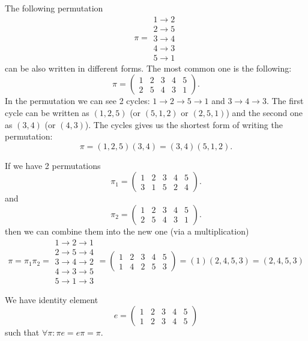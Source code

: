 \begin{appendices}
\begin{example}[Permutation]
  The following permutation
  \[ \pi = 
  \begin{array}{c}
    1 \to 2 \\
    2 \to 5 \\
    3 \to 4 \\
    4 \to 3 \\
    5 \to 1 
  \end{array}
  \]
  can be also written in different forms. The most common one is the following:
  \[
  \pi = \begin{pmatrix}
    1 & 2 & 3 & 4 & 5 \\
    2 & 5 & 4 & 3 & 1
  \end{pmatrix}.
  \]
  In the permutation we can see 2 cycles:
  $1 \to 2 \to 5 \to 1$ and $3 \to 4 \to 3$. The first cycle can be
  written as $(1,2,5)$ (or $(5,1,2)$ or $(2,5,1)$) and the second
  one as $(3,4)$ (or $(4,3)$). The cycles gives us the shortest form
  of writing the permutation:
  \[
  \pi = (1,2,5)(3,4) = (3,4)(5,1,2).
  \]
  
  If we have 2 permutations
  \[
  \pi_1 = \begin{pmatrix}
    1 & 2 & 3 & 4 & 5 \\
    3 & 1 & 5 & 2 & 4
  \end{pmatrix}.
  \]
  and
  \[
  \pi_2 = \begin{pmatrix}
    1 & 2 & 3 & 4 & 5 \\
    2 & 5 & 4 & 3 & 1
  \end{pmatrix}.
  \]
  then we can combine them into the new one (via a multiplication)
  \[ \pi = \pi_1 \pi_2 = 
  \begin{array}{c}
    1 \to 2 \to 1 \\
    2 \to 5 \to 4\\
    3 \to 4 \to 2\\
    4 \to 3 \to 5\\
    5 \to 1 \to 3 
  \end{array} =
  \begin{pmatrix}
    1 & 2 & 3 & 4 & 5 \\
    1 & 4 & 2 & 5 & 3
  \end{pmatrix} = (1)(2,4,5,3) = (2,4,5,3)
  \]

  We have identity element
  \[
  e =  \begin{pmatrix}
    1 & 2 & 3 & 4 & 5 \\
    1 & 2 & 3 & 4 & 5
  \end{pmatrix}
  \]
  such that $\forall \pi: \pi e = e \pi = \pi$.
  

\end{example}
\end{appendices}
